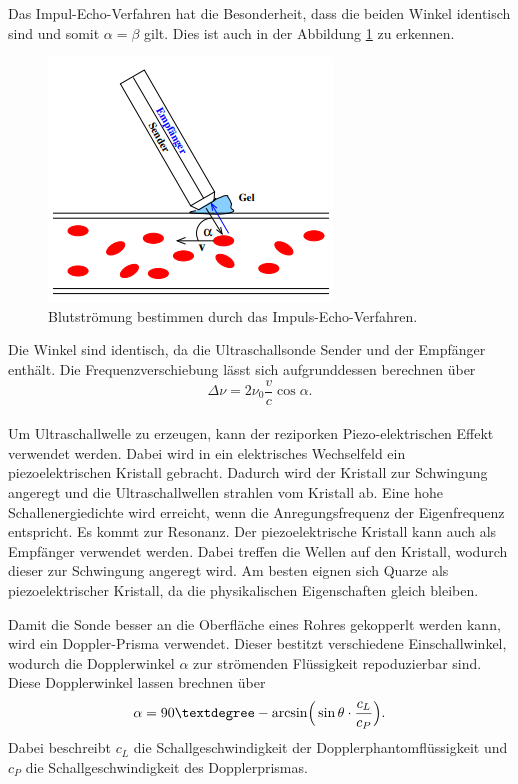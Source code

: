 Das Impul-Echo-Verfahren hat die Besonderheit, dass die beiden Winkel identisch sind und somit $\alpha = \beta$ gilt.
Dies ist auch in der Abbildung \ref{fig:IEV} zu erkennen.
\begin{figure}[H]
    \centering
    \includegraphics[scale=0.5]{content/TheoBild.png}
    \caption{Blutströmung bestimmen durch das Impuls-Echo-Verfahren.}
    \label{fig:IEV}
\end{figure}
Die Winkel sind identisch, da die Ultraschallsonde Sender und der Empfänger enthält.
Die Frequenzverschiebung lässt sich aufgrunddessen berechnen über
\begin{equation}
    \Delta \nu = 2 \nu_0 \frac{v}{c} \cos \alpha.
    \label{eq:deltaf}
\end{equation}
\\

\noindent Um Ultraschallwelle zu erzeugen, kann der reziporken Piezo-elektrischen Effekt verwendet werden.
Dabei wird in ein elektrisches Wechselfeld ein piezoelektrischen Kristall gebracht.
Dadurch wird der Kristall zur Schwingung angeregt und die Ultraschallwellen strahlen vom Kristall ab.
Eine hohe Schallenergiedichte wird erreicht, wenn die Anregungsfrequenz der Eigenfrequenz entspricht.
Es kommt zur Resonanz.
Der piezoelektrische Kristall kann auch als Empfänger verwendet werden.
Dabei treffen die Wellen auf den Kristall, wodurch dieser zur Schwingung angeregt wird.
Am besten eignen sich Quarze als piezoelektrischer Kristall, da die physikalischen Eigenschaften gleich bleiben.

\noindent Damit die Sonde besser an die Oberfläche eines Rohres gekopperlt werden kann, wird ein Doppler-Prisma verwendet.
Dieser bestitzt verschiedene Einschallwinkel, wodurch die Dopplerwinkel $\alpha$ zur strömenden Flüssigkeit repoduzierbar sind.
Diese Dopplerwinkel lassen brechnen über
\begin{equation}
    \alpha = 90° - \arcsin \Bigr( \sin \theta \cdot \frac{c_L}{c_P}\Bigl).
\end{equation}
Dabei beschreibt $c_L$ die Schallgeschwindigkeit der Dopplerphantomflüssigkeit und $c_P$ die Schallgeschwindigkeit des Dopplerprismas.

\cite{sample}
